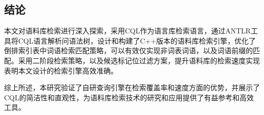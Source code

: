 \documentclass[11pt]{article}
\begin{document}
\begin{CJK*}{UTF8}{gbsn}
\section{结论}

本文对语料库检索进行深入探索，采用CQL作为语言库检索语言，通过ANTLR工具将CQL语言解析问语法树，设计和构建了C++版本的语料库检索引擎，优化了倒排索引表中词语检索匹配策略，可以有效仅实现非词表词语，以及词语前缀的匹配。采用二阶段检索策略，以及候选标记位过滤方案，提升语料库的检索速度实现表明本文设计的检索引擎高效准确。

综上所述，本研究验证了自研查询引擎在检索覆盖率和速度方面的优势，并展示了CQL的简洁性和直观性，为语料库检索技术的研究和应用提供了有益参考和高效工具。


%


\end{CJK*}
\end{document}
